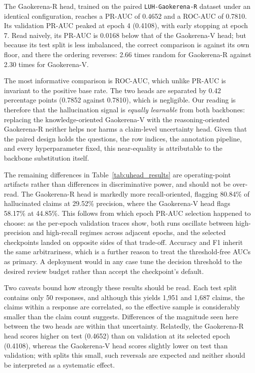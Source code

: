\documentclass[review]{elsarticle}
\begin{document}
The Gaokerena-R head, trained on the paired \texttt{LUH-Gaokerena-R} dataset under an identical configuration, reaches a PR-AUC of 0.4652 and a ROC-AUC of 0.7810. Its validation PR-AUC peaked at epoch 4 (0.4108), with early stopping at epoch 7. Read naively, its PR-AUC is 0.0168 below that of the Gaokerena-V head; but because its test split is less imbalanced, the correct comparison is against its own floor, and there the ordering reverses: 2.66 times random for Gaokerena-R against 2.30 times for Gaokerena-V.

The most informative comparison is ROC-AUC, which unlike PR-AUC is invariant to the positive base rate. The two heads are separated by 0.42 percentage points (0.7852 against 0.7810), which is negligible. Our reading is therefore that the hallucination signal is \emph{equally learnable} from both backbones: replacing the knowledge-oriented Gaokerena-V with the reasoning-oriented Gaokerena-R neither helps nor harms a claim-level uncertainty head. Given that the paired design holds the questions, the row indices, the annotation pipeline, and every hyperparameter fixed, this near-equality is attributable to the backbone substitution itself.

The remaining differences in Table~\ref{tab:uhead_results} are operating-point artifacts rather than differences in discriminative power, and should not be over-read. The Gaokerena-R head is markedly more recall-oriented, flagging 80.84\% of hallucinated claims at 29.52\% precision, where the Gaokerena-V head flags 58.17\% at 44.85\%. This follows from which epoch PR-AUC selection happened to choose: as the per-epoch validation traces show, both runs oscillate between high-precision and high-recall regimes across adjacent epochs, and the selected checkpoints landed on opposite sides of that trade-off. Accuracy and F1 inherit the same arbitrariness, which is a further reason to treat the threshold-free AUCs as primary. A deployment would in any case tune the decision threshold to the desired review budget rather than accept the checkpoint's default.

Two caveats bound how strongly these results should be read. Each test split contains only 50 responses, and although this yields 1{,}951 and 1{,}687 claims, the claims within a response are correlated, so the effective sample is considerably smaller than the claim count suggests. Differences of the magnitude seen here between the two heads are within that uncertainty. Relatedly, the Gaokerena-R head scores higher on test (0.4652) than on validation at its selected epoch (0.4108), whereas the Gaokerena-V head scores slightly lower on test than validation; with splits this small, such reversals are expected and neither should be interpreted as a systematic effect.
\end{document}
